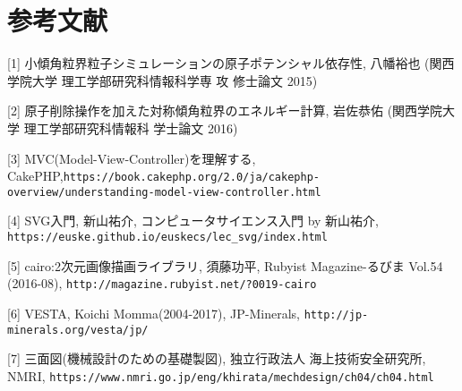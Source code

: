 \section{参考文献}
[1] 小傾角粒界粒子シミュレーションの原子ポテンシャル依存性, 八幡裕也 (関西学院大学 理工学部研究科情報科学専 攻 修士論文 2015)

[2] 原子削除操作を加えた対称傾角粒界のエネルギー計算, 岩佐恭佑 (関西学院大学 理工学部研究科情報科 学士論文 2016)

[3] MVC(Model-View-Controller)を理解する, CakePHP,\verb|https://book.cakephp.org/2.0/ja/cakephp-overview/understanding-model-view-controller.html| 

[4] SVG入門, 新山祐介, コンピュータサイエンス入門 by 新山祐介, \verb|https://euske.github.io/euskecs/lec_svg/index.html| 

[5] cairo:2次元画像描画ライブラリ, 須藤功平, Rubyist Magazine-るびま Vol.54 (2016-08), \verb|http://magazine.rubyist.net/?0019-cairo| 

[6] VESTA, Koichi Momma(2004-2017), JP-Minerals, \verb|http://jp-minerals.org/vesta/jp/| 

[7] 三面図(機械設計のための基礎製図), 独立行政法人 海上技術安全研究所, NMRI, \verb|https://www.nmri.go.jp/eng/khirata/mechdesign/ch04/ch04.html|

